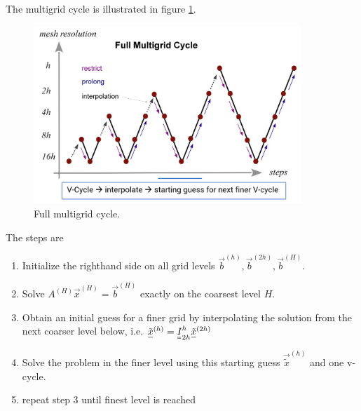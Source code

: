 
The multigrid cycle is illustrated in figure \ref{fig:full_multigrid}.

\begin{figure}[H]
    \centering
    \includegraphics[width=0.9\textwidth]{figures/multigrid_cycle.png}
    \caption{Full multigrid cycle.}
    \label{fig:full_multigrid}
\end{figure}

The steps are
\begin{enumerate}
    \item Initialize the righthand side on all grid levels $\vec{b}^{(h)}, \vec{b}^{(2h)}, \vec{b}^{(H)}$.
    \item Solve $A^{(H)} \vec{x}^{(H)} = \vec{b}^{(H)}$ exactly on the coarsest level $H$.
    \item Obtain an initial guess for a finer grid by interpolating the solution from the next coarser level below, i.e. $\vec{\tilde{x}}^{(h)} = \mat{I}_{2h}^{h} \vec{\tilde{x}}^{(2h)}$
    \item Solve the problem in the finer level using this starting guess $\vec{\tilde{x}}^{(h)}$ and \textcolor{blue1}{one v-cycle}.
    \item repeat step 3 until finest level is reached
\end{enumerate}


